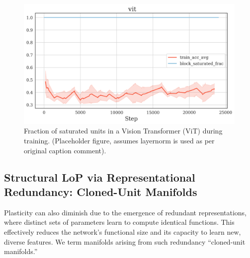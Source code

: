 \documentclass{article}
\begin{document}
\begin{figure}[h!]
    \centering
    \includegraphics[width=0.4\linewidth]{sat_frac_vit.png} 
    \caption{Fraction of saturated units in a Vision Transformer (ViT) during training. (Placeholder figure, assumes layernorm is used as per original caption comment).}
    \label{fig:SatFracViT}
\end{figure}


\subsection{Structural LoP via Representational Redundancy: Cloned-Unit Manifolds}
\label{sec:cloned_units}
Plasticity can also diminish due to the emergence of redundant representations, where distinct sets of parameters learn to compute identical functions. This effectively reduces the network's functional size and its capacity to learn new, diverse features. We term manifolds arising from such redundancy ``cloned-unit manifolds.''
\end{document}
